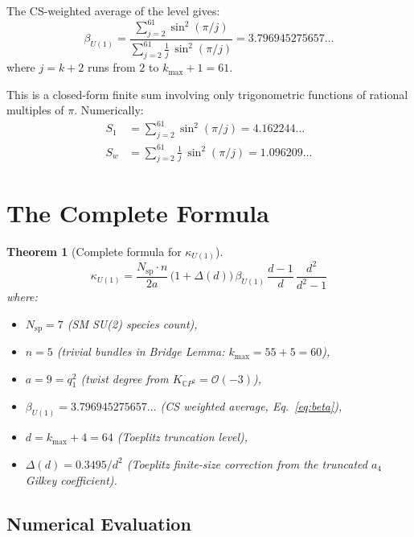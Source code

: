 \documentclass[12pt,a4paper]{article}
\newtheorem{theorem}{Theorem}
\theoremstyle{definition}
\begin{document}
The CS-weighted average of the level gives:
\begin{equation}\label{eq:beta}
\beta_{U(1)} = \frac{\sum_{j=2}^{61}\sin^2(\pi/j)}
{\sum_{j=2}^{61}\frac{1}{j}\,\sin^2(\pi/j)}
= 3.796945275657\ldots
\end{equation}
where $j = k + 2$ runs from $2$ to $k_{\max}+1 = 61$.

This is a closed-form finite sum involving only trigonometric functions of
rational multiples of $\pi$.  Numerically:
\begin{align}
S_1 &= \sum_{j=2}^{61}\sin^2(\pi/j) = 4.162244\ldots \\
S_w &= \sum_{j=2}^{61}\frac{1}{j}\,\sin^2(\pi/j) = 1.096209\ldots
\end{align}

\section{The Complete Formula}
\label{sec:complete}

\begin{theorem}[Complete formula for $\kappa_{U(1)}$]
\label{thm:kappa}
\begin{equation}\label{eq:kappa-complete}
\boxed{
\kappa_{U(1)} = \frac{N_{\mathrm{sp}} \cdot n}{2a}\,
\bigl(1 + \Delta(d)\bigr)\,\beta_{U(1)}\,
\frac{d-1}{d}\,\frac{d^2}{d^2-1}
}
\end{equation}
where:
\begin{itemize}
\item $N_{\mathrm{sp}} = 7$ \quad (SM SU(2) species count),
\item $n = 5$ \quad (trivial bundles in Bridge Lemma: $k_{\max} = 55 + 5 = 60$),
\item $a = 9 = q_1^2$ \quad (twist degree from $K_{\mathbb{C}P^2} = \mathcal{O}(-3)$),
\item $\beta_{U(1)} = 3.796945275657\ldots$ \quad (CS weighted average,
  Eq.~\eqref{eq:beta}),
\item $d = k_{\max} + 4 = 64$ \quad (Toeplitz truncation level),
\item $\Delta(d) = 0.3495/d^2$ \quad (Toeplitz finite-size correction
  from the truncated $a_4$ Gilkey coefficient).
\end{itemize}
\end{theorem}

\subsection{Numerical Evaluation}
\end{document}
